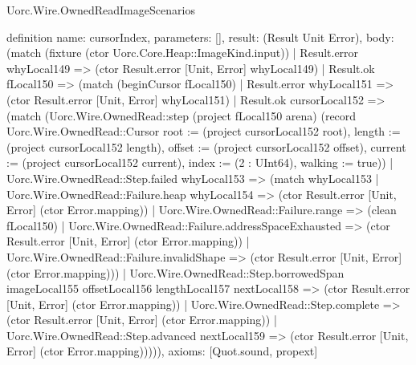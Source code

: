 \begin{lexlean}{Uorc.Wire.OwnedReadImageScenarios}
\begin{semanticmodule}
definition{
  name: cursorIndex,
  parameters: [],
  result: (Result Unit Error),
  body: (match (fixture (ctor Uorc.Core.Heap::ImageKind.input))
    | Result.error whyLocal149 => (ctor Result.error [Unit, Error] whyLocal149)
    | Result.ok fLocal150 => (match (beginCursor fLocal150)
      | Result.error whyLocal151 => (ctor Result.error [Unit, Error] whyLocal151)
      | Result.ok cursorLocal152 => (match (Uorc.Wire.OwnedRead::step (project fLocal150 arena) (record Uorc.Wire.OwnedRead::Cursor {root := (project cursorLocal152 root), length := (project cursorLocal152 length), offset := (project cursorLocal152 offset), current := (project cursorLocal152 current), index := (2 : UInt64), walking := true}))
        | Uorc.Wire.OwnedRead::Step.failed whyLocal153 => (match whyLocal153
          | Uorc.Wire.OwnedRead::Failure.heap whyLocal154 => (ctor Result.error [Unit, Error] (ctor Error.mapping))
          | Uorc.Wire.OwnedRead::Failure.range => (clean fLocal150)
          | Uorc.Wire.OwnedRead::Failure.addressSpaceExhausted => (ctor Result.error [Unit, Error] (ctor Error.mapping))
          | Uorc.Wire.OwnedRead::Failure.invalidShape => (ctor Result.error [Unit, Error] (ctor Error.mapping)))
        | Uorc.Wire.OwnedRead::Step.borrowedSpan imageLocal155 offsetLocal156 lengthLocal157 nextLocal158 => (ctor Result.error [Unit, Error] (ctor Error.mapping))
        | Uorc.Wire.OwnedRead::Step.complete => (ctor Result.error [Unit, Error] (ctor Error.mapping))
        | Uorc.Wire.OwnedRead::Step.advanced nextLocal159 => (ctor Result.error [Unit, Error] (ctor Error.mapping))))),
  axioms: [Quot.sound, propext]
}


\end{semanticmodule}
\end{lexlean}

